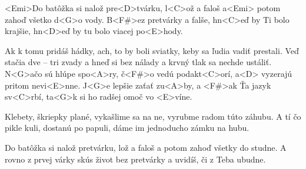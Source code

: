 

<Emi>Do batôžka si nalož pre<D>tvárku, l<C>ož a faloš 
a<Emi> potom zahoď všetko d<G>o vody. 
B<F#>ez pretvárky a falše, hn<C>eď by Ti bolo krajšie, 
hn<D>eď by tu bolo viacej po<E>hody. 

Ak k tomu pridáš hádky, 
ach, to by boli sviatky, 
keby sa ľudia vadiť prestali. 
Veď stačia dve – tri zvady 
a hneď si bez nálady 
a krvný tlak sa nechde ustáliť. 
N<G>ačo sú hlúpe spo<A>ry, 
č<F#>o vedú podakt<C>orí, 
a<D> vyzerajú pritom nevi<E>nne. 
J<G>e lepšie zaťať zu<A>by, 
a <F#>ak Ťa jazyk sv<C>rbí, 
ta<G>k si ho radšej omoč vo <E>víne. 

Klebety, škriepky plané, 
vykašlime sa na ne, 
vyrubme radom túto záhubu. 
A tí čo pikle kuli, dostanú po papuli, 
dáme im jednoducho zámku na hubu. 

Do batôžka si nalož pretvárku, lož a faloš 
a potom zahoď všetky do studne. 
A rovno z prvej várky 
skús život bez pretvárky 
a uvidíš, či z Teba ubudne. 
\kp
